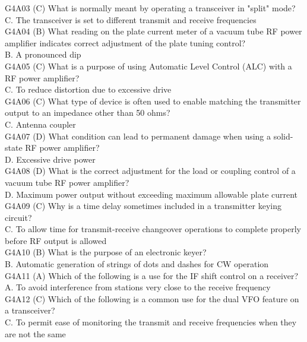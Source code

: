 \documentclass[12pt,letterpaper]{report}
\begin{document}
G4A03 (C) What is normally meant by operating a transceiver in "split" mode?\\
C. The transceiver is set to different transmit and receive frequencies\\

G4A04 (B) What reading on the plate current meter of a vacuum tube RF power amplifier indicates correct adjustment of the plate tuning control?\\
B. A pronounced dip\\

G4A05 (C) What is a purpose of using Automatic Level Control (ALC) with a RF power amplifier?\\
C. To reduce distortion due to excessive drive\\

G4A06 (C) What type of device is often used to enable matching the transmitter output to an impedance other than 50 ohms?\\
C. Antenna coupler\\

G4A07 (D) What condition can lead to permanent damage when using a solid-state RF power amplifier?\\
D. Excessive drive power\\

G4A08 (D) What is the correct adjustment for the load or coupling control of a vacuum tube RF power amplifier?\\
D. Maximum power output without exceeding maximum allowable plate current\\

G4A09 (C) Why is a time delay sometimes included in a transmitter keying circuit?\\
C. To allow time for transmit-receive changeover operations to complete properly before RF output is allowed\\

G4A10 (B) What is the purpose of an electronic keyer?\\
B. Automatic generation of strings of dots and dashes for CW operation \\

G4A11 (A) Which of the following is a use for the IF shift control on a receiver?\\
A. To avoid interference from stations very close to the receive frequency\\

G4A12 (C) Which of the following is a common use for the dual VFO feature on a transceiver? \\
C. To permit ease of monitoring the transmit and receive frequencies when they are not the same\\
\end{document}

